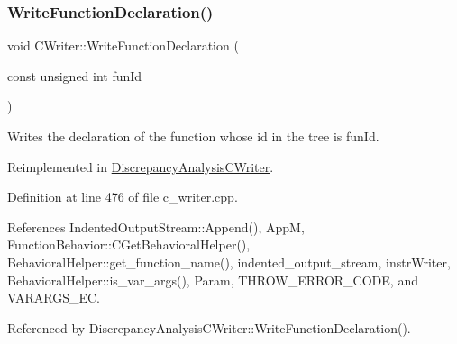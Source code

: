 \subsubsection{\texorpdfstring{Write\+Function\+Declaration()}{WriteFunctionDeclaration()}}
{\footnotesize\ttfamily void C\+Writer\+::\+Write\+Function\+Declaration (\begin{DoxyParamCaption}\item[{const unsigned int}]{fun\+Id }\end{DoxyParamCaption})\hspace{0.3cm}{\ttfamily [virtual]}}



Writes the declaration of the function whose id in the tree is fun\+Id. 



Reimplemented in \hyperlink{classDiscrepancyAnalysisCWriter_a190bda3bc90a238e772d319afd83becc}{Discrepancy\+Analysis\+C\+Writer}.



Definition at line 476 of file c\+\_\+writer.\+cpp.



References Indented\+Output\+Stream\+::\+Append(), AppM, Function\+Behavior\+::\+C\+Get\+Behavioral\+Helper(), Behavioral\+Helper\+::get\+\_\+function\+\_\+name(), indented\+\_\+output\+\_\+stream, instr\+Writer, Behavioral\+Helper\+::is\+\_\+var\+\_\+args(), Param, T\+H\+R\+O\+W\+\_\+\+E\+R\+R\+O\+R\+\_\+\+C\+O\+DE, and V\+A\+R\+A\+R\+G\+S\+\_\+\+EC.



Referenced by Discrepancy\+Analysis\+C\+Writer\+::\+Write\+Function\+Declaration().

